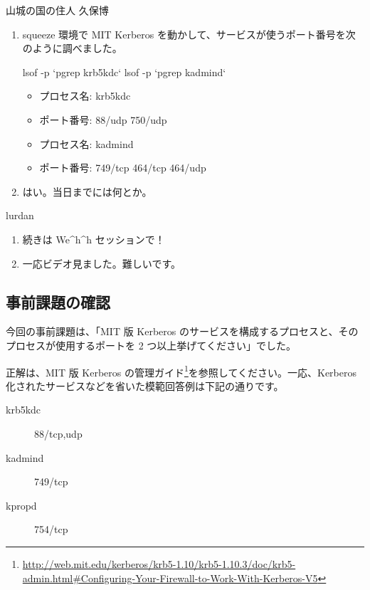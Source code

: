 \documentclass[mingoth,a4paper]{jsarticle}
\begin{document}
\begin{prework}{ 山城の国の住人 久保博 }
  \begin{enumerate}
  \item squeeze 環境で MIT Kerberos を動かして、サービスが使うポート番号を次のように調べました。
    \begin{commandline}
lsof -p `pgrep krb5kdc`
lsof -p `pgrep kadmind`
    \end{commandline}
    \begin{itemize}
    \item プロセス名: krb5kdc
    \item ポート番号: 88/udp 750/udp
    \item プロセス名: kadmind
    \item ポート番号: 749/tcp 464/tcp 464/udp
    \end{itemize}
  \item はい。当日までには何とか。
  \end{enumerate}
\end{prework}

\begin{prework}{ lurdan }
  \begin{enumerate}
  \item 続きは We\^{}h\^{}h セッションで！
  \item 一応ビデオ見ました。難しいです。
  \end{enumerate}
\end{prework}

\clearpage


\subsection{事前課題の確認}

今回の事前課題は、「MIT 版 Kerberos のサービスを構成するプロセスと、そのプロセスが使用するポートを 2 つ以上挙げてください」でした。

正解は、MIT 版 Kerberos の管理ガイド\footnote{\url{http://web.mit.edu/kerberos/krb5-1.10/krb5-1.10.3/doc/krb5-admin.html\#Configuring-Your-Firewall-to-Work-With-Kerberos-V5}}を参照してください。一応、Kerberos 化されたサービスなどを省いた模範回答例は下記の通りです。

\begin{description}
\item [krb5kdc] 88/tcp,udp
\item [kadmind] 749/tcp
\item [kpropd] 754/tcp
\end{description}
\end{document}
